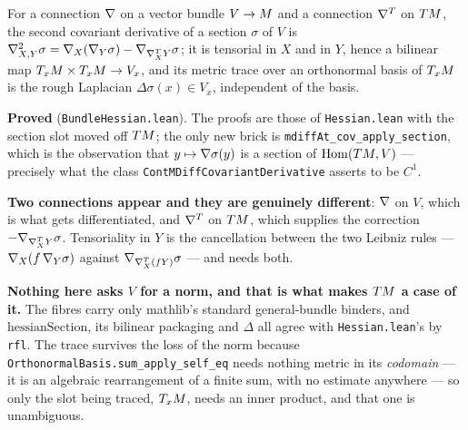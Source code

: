 \begin{lemma}
  \label{lem:bundle-hessian}
  \leanok
  For a connection $\nabla$ on a vector bundle $V \to M$ and a connection $\nabla^{T}$ on
  $TM$, the second covariant derivative of a section $\sigma$ of $V$ is
  $\nabla^2_{X,Y}\sigma = \nabla_X(\nabla_Y \sigma) - \nabla_{\nabla^T_X Y}\sigma$; it is tensorial in
  $X$ and in $Y$, hence a bilinear map $T_xM \times T_xM \to V_x$, and its metric trace
  over an orthonormal basis of $T_xM$ is the rough Laplacian $\Delta\sigma(x) \in V_x$,
  independent of the basis.

  \textbf{Proved} (\texttt{BundleHessian.lean}). The proofs are those of
  \texttt{Hessian.lean} with the section slot moved off $TM$; the only new brick is
  \texttt{mdiffAt\_cov\_apply\_section}, which is the observation that
  $y \mapsto \nabla\sigma(y)$ is a section of $\mathrm{Hom}(TM, V)$ --- precisely what the
  class \texttt{ContMDiffCovariantDerivative} asserts to be $C^1$.

  \textbf{Two connections appear and they are genuinely different}: $\nabla$ on $V$, which is
  what gets differentiated, and $\nabla^T$ on $TM$, which supplies the correction
  $-\nabla_{\nabla^T_X Y}\sigma$. Tensoriality in $Y$ is the cancellation between the two Leibniz
  rules --- $\nabla_X(f\,\nabla_Y\sigma)$ against $\nabla_{\nabla^T_X(fY)}\sigma$ --- and needs both.

  \textbf{Nothing here asks $V$ for a norm, and that is what makes $TM$ a case of it.}
  The fibres carry only mathlib's standard general-bundle binders, and
  $\mathrm{hessianSection}$, its bilinear packaging and $\Delta$ all agree with
  \texttt{Hessian.lean}'s by \texttt{rfl}. The trace survives the loss of the norm because
  \texttt{OrthonormalBasis.sum\_apply\_self\_eq} needs nothing metric in its
  \emph{codomain} --- it is an algebraic rearrangement of a finite sum, with no estimate
  anywhere --- so only the slot being traced, $T_xM$, needs an inner product, and that one
  is unambiguous.


\end{lemma}
